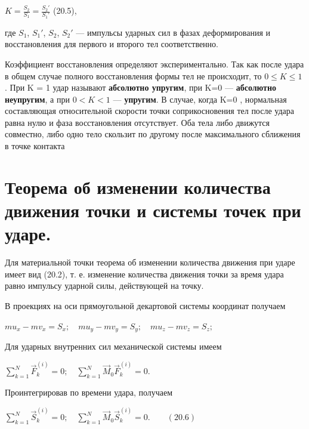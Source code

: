 {\begin{center}
\par $K = \frac{S_2}{S_1} =\frac{S_2'}{S_1'}$ \qquad \qquad (20.5),

\par где $S_1$, $S_1'$, $S_2$, $S_2'$ — импульсы ударных сил в фазах деформирования и восстановления для первого и второго тел соответственно.

\par Коэффициент  восстановления определяют  экспериментально.  Так  как после удара в общем случае полного восстановления формы тел не происходит, то $0\leqslant K \leqslant 1$ . При K = 1 удар называют \textbf{абсолютно упругим}, при  K=0  — \textbf{абсолютно неупругим}, а при $0<K<1$  — \textbf{упругим}. В случае, когда  K=0 , нормальная составляющая относительной скорости точки соприкосновения тел после удара равна нулю и фаза восстановления отсутствует. Оба тела либо движутся совместно, либо одно тело скользит по другому после максимального сближения в точке контакта

\end{center}

\section{Теорема об изменении количества движения точки и системы точек при ударе.}

\begin{center}

\par Для материальной точки теорема об изменении количества движения при ударе имеет вид (20.2), т. е. изменение количества движения точки за время удара равно импульсу ударной силы, действующей на точку.

\par В  проекциях на  оси  прямоугольной  декартовой  системы  координат получаем

\par $mu_x - mv_x = S_x; \quad mu_y - mv_y = S_y; \quad mu_z - mv_z = S_z; $

\par Для ударных внутренних сил механической системы имеем

\par $\sum\limits_{k=1}^N \vec{F}_k^{(i)} = 0;
\quad \sum\limits_{k=1}^N \vec{M}_0\vec{F}_k^{(i)} = 0.$

\par Проинтегрировав по времени удара, получаем

\par $\sum\limits_{k=1}^N \vec{S}_k^{(i)} = 0;
\quad \sum\limits_{k=1}^N \vec{M}_0\vec{S}_k^{(i)} = 0. \quad\quad (20.6)$


\end{center}}
